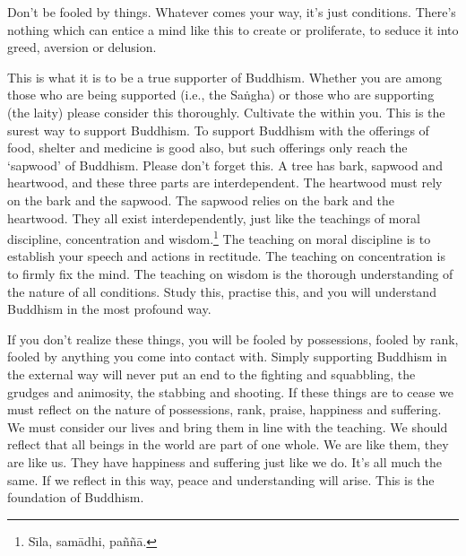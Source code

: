 Don't be fooled by things. Whatever comes your way, it's just conditions. There's nothing which can entice a mind like this to create or proliferate, to seduce it into greed, aversion or delusion. 

This is what it is to be a true supporter of Buddhism. Whether you are among those who are being supported (i.e., the Sa\.ngha) or those who are supporting (the laity) please consider this thoroughly. Cultivate the  within you. This is the surest way to support Buddhism. To support Buddhism with the offerings of food, shelter and medicine is good also, but such offerings only reach the `sapwood' of Buddhism. Please don't forget this. A tree has bark, sapwood and heartwood, and these three parts are interdependent. The heartwood must rely on the bark and the sapwood. The sapwood relies on the bark and the heartwood. They all exist interdependently, just like the teachings of moral discipline, concentration and wisdom.\footnote{S\={\i}la, sam\=adhi, pa\~n\~n\=a.} The teaching on moral discipline is to establish your speech and actions in rectitude. The teaching on concentration is to firmly fix the mind. The teaching on wisdom is the thorough understanding of the nature of all conditions. Study this, practise this, and you will understand Buddhism in the most profound way. 

If you don't realize these things, you will be fooled by possessions, fooled by rank, fooled by anything you come into contact with. Simply supporting Buddhism in the external way will never put an end to the fighting and squabbling, the grudges and animosity, the stabbing and shooting. If these things are to cease we must reflect on the nature of possessions, rank, praise, happiness and suffering. We must consider our lives and bring them in line with the teaching. We should reflect that all beings in the world are part of one whole. We are like them, they are like us. They have happiness and suffering just like we do. It's all much the same. If we reflect in this way, peace and understanding will arise. This is the foundation of Buddhism.

